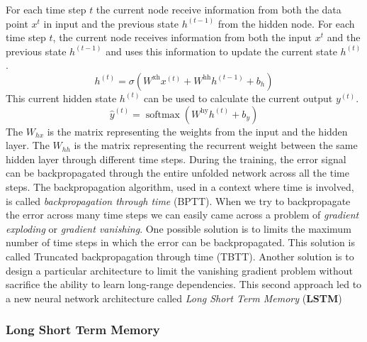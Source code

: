 For each time step $t$ the current node receive information from both the data point $x^{t}$ in input and the previous state $h^{(t-1)}$ from the hidden node.
For each time step $t$, the current node receives information from both the input $x^{t}$ and the previous state $h^{(t-1)}$ and uses this information to update the current state $h^{(t)}$.
$$h^{(t)}=\sigma\left(W^{\mathrm{xh}} {x}^{(t)}+W^{\mathrm{hh}} {h}^{(t-1)}+{b}_{h}\right)$$
This current hidden state $h^{(t)}$ can be used to calculate the current output $y^{(t)}$.
$$\hat{y}^{(t)}=\operatorname{softmax}\left(W^{\mathrm{hy}} h^{(t)}+b_{y}\right)$$
The $W_{hx}$ is the matrix representing the weights from the input and the hidden layer.
The $W_{hh}$ is the matrix representing the recurrent weight between the same hidden layer through different time steps.
During the training, the error signal can be backpropagated through the entire unfolded network across all the time steps.
The backpropagation algorithm, used in a context where time is involved, is called \textit{backpropagation through time} (BPTT).
When we try to backpropagate the error across many time steps we can easily came across a problem of \textit{gradient exploding} or \textit{gradient vanishing}. One possible solution is to limits the maximum number of time steps in which the error can be backpropagated.
This solution is called Truncated backpropagation through time (TBTT).
Another solution is to design a particular architecture to limit the vanishing gradient problem without sacrifice the ability to learn long-range dependencies. 
This second approach led to a new neural network architecture called \textit{Long Short Term Memory} (\textbf{LSTM}) 


        \subsubsection{Long Short Term Memory}


